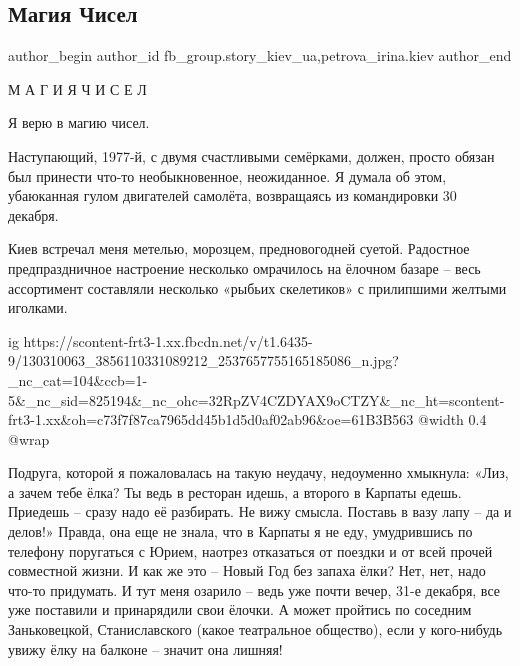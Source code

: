  
 
 
 
 
 
\subsection{Магия Чисел}
\label{sec:07_12_2020.fb.fb_group.story_kiev_ua.2.magia_chisel}
 
\ifcmt
 author_begin
   author_id fb_group.story_kiev_ua,petrova_irina.kiev
 author_end
\fi

М А Г И Я Ч И С Е Л

Я верю в магию чисел.

Наступающий, 1977-й, с двумя счастливыми семёрками, должен, просто обязан был
принести что-то необыкновенное, неожиданное. Я думала об этом, убаюканная гулом
двигателей самолёта, возвращаясь из командировки 30 декабря.

Киев встречал меня метелью, морозцем, предновогодней суетой. Радостное
предпраздничное настроение несколько омрачилось на ёлочном базаре – весь
ассортимент составляли несколько «рыбьих скелетиков» с прилипшими желтыми
иголками.

\ifcmt
  ig https://scontent-frt3-1.xx.fbcdn.net/v/t1.6435-9/130310063_3856110331089212_2537657755165185086_n.jpg?_nc_cat=104&ccb=1-5&_nc_sid=825194&_nc_ohc=32RpZV4CZDYAX9oCTZY&_nc_ht=scontent-frt3-1.xx&oh=c73f7f87ca7965dd45b1d5d0af02ab96&oe=61B3B563
  @width 0.4
  @wrap 
\fi

Подруга, которой я пожаловалась на такую неудачу, недоуменно хмыкнула: «Лиз, а
зачем тебе ёлка? Ты ведь в ресторан идешь, а второго в Карпаты едешь. Приедешь
– сразу надо её разбирать. Не вижу смысла. Поставь в вазу лапу – да и делов!»
Правда, она еще не знала, что в Карпаты я не еду, умудрившись по телефону
поругаться с Юрием, наотрез отказаться от поездки и от всей прочей совместной
жизни. И как же это – Новый Год без запаха ёлки? Нет, нет, надо что-то
придумать. И тут меня озарило – ведь уже почти вечер, 31-е декабря, все уже
поставили и принарядили свои ёлочки. А может пройтись по соседним Заньковецкой,
Станиславского (какое театральное общество), если у кого-нибудь увижу ёлку на
балконе – значит она лишняя!

